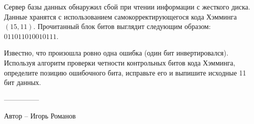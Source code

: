 \question
Сервер базы данных обнаружил сбой при чтении информации с жесткого диска. Данные хранятся с использованием самокорректирующегося кода Хэмминга $(15,11)$. Прочитанный блок битов выглядит следующим образом: $011011010010111$.

Известно, что произошла ровно одна ошибка (один бит инвертировался). Используя алгоритм проверки четности контрольных битов кода Хэмминга, определите позицию ошибочного бита, исправьте его и выпишите исходные 11 бит данных.

---------------

Автор -- Игорь Романов
